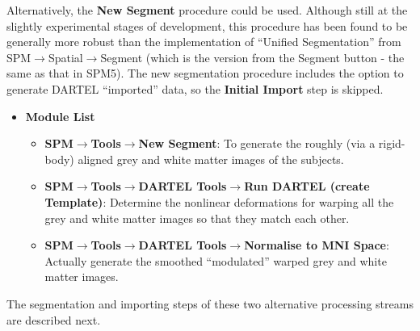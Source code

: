 Alternatively, the {\bf New Segment} procedure could be used.
Although still at the slightly experimental stages of development, this procedure has been found to be generally more robust than the implementation of ``Unified Segmentation'' from SPM$\rightarrow$Spatial$\rightarrow$Segment (which is the version from the Segment button - the same as that in SPM5).
The new segmentation procedure includes the option to generate DARTEL ``imported'' data, so the {\bf Initial Import} step is skipped.
\begin{itemize}
\item{{\bf Module List}
  \begin{itemize}
  \item{{\bf SPM$\rightarrow$Tools$\rightarrow$New Segment}: To generate the roughly (via a rigid-body) aligned grey and white matter images of the subjects.}
  \item{{\bf SPM$\rightarrow$Tools$\rightarrow$DARTEL Tools$\rightarrow$Run DARTEL (create Template)}: Determine the nonlinear deformations for warping all the grey and white matter images so that they match each other.}
  \item{{\bf SPM$\rightarrow$Tools$\rightarrow$DARTEL Tools$\rightarrow$Normalise to MNI Space}: Actually generate the smoothed ``modulated'' warped grey and white matter images.}
  \end{itemize}
}
\end{itemize}

The segmentation and importing steps of these two alternative processing streams are described next.

